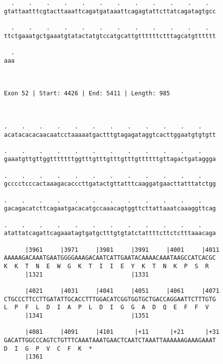 \documentclass{article}
\begin{document}
\begin{Verbatim}
  .    .    .    .    .    .    .    .    .    .    .    .  
gtattaatttcgtacttaaattcagatgataaattcagagtattcttatcagatagtgcc
                                                            
  .    .    .    .    .    .    .    .    .    .    .    .  
ttctgaaatgctgaaatgtatactatgtccatgcattgttttttctttagcatgtttttt
                                                            
  .
aaa
   
   
 
Exon 52 | Start: 4426 | End: 5411 | Length: 985



.    .    .    .    .    .    .    .    .    .    .    .    
acatacacacaacaatcctaaaaatgactttgtagagataggtcacttggaatgtgtgtt
                                                            
.    .    .    .    .    .    .    .    .    .    .    .    
gaaatgttgttggtttttttggtttgtttgtttgtttgttttttgttagactgataggga
                                                            
.    .    .    .    .    .    .    .    .    .    .    .    
gcccctcccactaaagacacccttgatactgttatttcaaggatgaacttatttatctgg
                                                            
.    .    .    .    .    .    .    .    .    .    .    .    
gacagacatcttcagaatgacacatgccaaacagtggttcttattaaatcaaaggttcag
                                                            
.    .    .    .    .    .    .    .    .    .    .    .    
atattatcagattcagaaatagtgatgctttgtgtatctattttcttctctttaaacaga
                                                            
      |3961     |3971     |3981     |3991     |4001     |4011
AAAAAGACAAATGAATGGGGAAAGACAATCATTGAATACAAAACAAATAAGCCATCACGC
K  K  T  N  E  W  G  K  T  I  I  E  Y  K  T  N  K  P  S  R  
      |1321                         |1331                   
  
      |4021     |4031     |4041     |4051     |4061     |4071
CTGCCCTTCCTTGATATTGCACCTTTGGACATCGGTGGTGCTGACCAGGAATTCTTTGTG
L  P  F  L  D  I  A  P  L  D  I  G  G  A  D  Q  E  F  F  V  
      |1341                         |1351                   
  
      |4081     |4091     |4101      |+11      |+21      |+31
GACATTGGCCCAGTCTGTTTCAAATAAATGAACTCAATCTAAATTAAAAAAGAAAGAAAT
D  I  G  P  V  C  F  K  *   
      |1361                                                 
  

\end{Verbatim}
\end{document}
